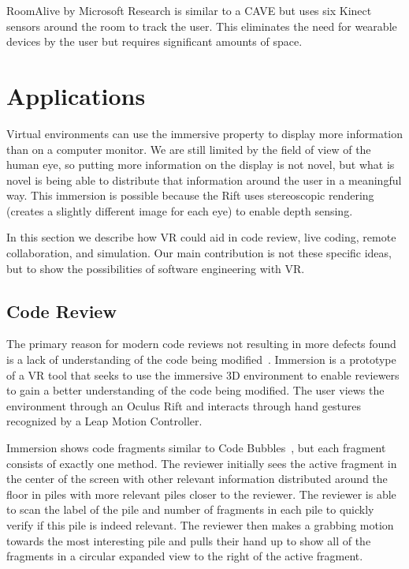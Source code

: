 \documentclass{acm_proc_article-sp}
\begin{document}
RoomAlive by Microsoft Research is similar to a CAVE but uses six Kinect sensors around the room to track the user.  This eliminates the need for wearable devices by the user but requires significant amounts of space.~\cite{Jones:RoomAlive}

\section{Applications}
Virtual environments can use the immersive property to display more information than on a computer monitor. We are still limited by the field of view of the human eye, so putting more information on the display is not novel, but what is novel is being able to distribute that information around the user in a meaningful way. This immersion is possible because the Rift uses stereoscopic rendering (creates a slightly different image for each eye) to enable depth sensing.

In this section we describe how VR could aid in code review, live coding, remote collaboration, and simulation. Our main contribution is not these specific ideas, but to show the possibilities of software engineering with VR.

\subsection{Code Review}
The primary reason for modern code reviews not resulting in more defects found is a lack of understanding of the code being modified~\cite{bacchelli:ModernCodeReviewChallenges}. Immersion is a prototype of a VR tool that seeks to use the immersive 3D environment to enable reviewers to gain a better understanding of the code being modified. The user views the environment through an Oculus Rift and interacts through hand gestures recognized by a Leap Motion Controller.

Immersion shows code fragments similar to Code Bubbles~\cite{Bragdon:CodeBubbles}, but each fragment consists of exactly one method.  The reviewer initially sees the active fragment in the center of the screen with other relevant information distributed around the floor in piles with more relevant piles closer to the reviewer. The reviewer is able to scan the label of the pile and number of fragments in each pile to quickly verify if this pile is indeed relevant. The reviewer then makes a grabbing motion towards the most interesting pile and pulls their hand up to show all of the fragments in a circular expanded view to the right of the active fragment.
\end{document}
